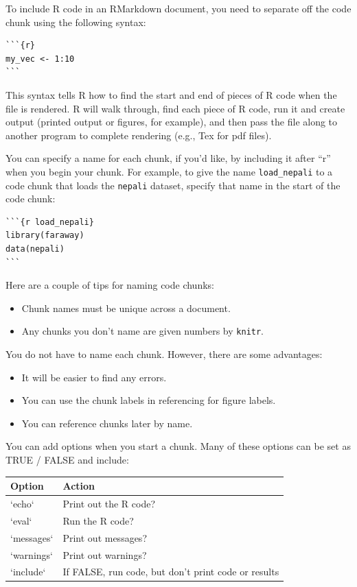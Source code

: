 \documentclass[]{book}
\providecommand{\tightlist}{%
  \setlength{\itemsep}{0pt}\setlength{\parskip}{0pt}}
\theoremstyle{definition}
\theoremstyle{definition}
\theoremstyle{definition}
\theoremstyle{remark}
\begin{document}
To include R code in an RMarkdown document, you need to separate off the
code chunk using the following syntax:

\begin{verbatim}
```{r}
my_vec <- 1:10
```
\end{verbatim}

This syntax tells R how to find the start and end of pieces of R code
when the file is rendered. R will walk through, find each piece of R
code, run it and create output (printed output or figures, for example),
and then pass the file along to another program to complete rendering
(e.g., Tex for pdf files).

You can specify a name for each chunk, if you'd like, by including it
after ``r'' when you begin your chunk. For example, to give the name
\texttt{load\_nepali} to a code chunk that loads the \texttt{nepali}
dataset, specify that name in the start of the code chunk: \bigskip

\begin{verbatim}
```{r load_nepali}
library(faraway)
data(nepali)
```
\end{verbatim}

Here are a couple of tips for naming code chunks:

\begin{itemize}
\tightlist
\item
  Chunk names must be unique across a document.
\item
  Any chunks you don't name are given numbers by \texttt{knitr}.
\end{itemize}

You do not have to name each chunk. However, there are some advantages:

\begin{itemize}
\tightlist
\item
  It will be easier to find any errors.\\
\item
  You can use the chunk labels in referencing for figure labels.
\item
  You can reference chunks later by name.
\end{itemize}

You can add options when you start a chunk. Many of these options can be
set as TRUE / FALSE and include:

\begin{tabular}{l|l}
\hline
Option & Action\\
\hline
`echo` & Print out the R code?\\
\hline
`eval` & Run the R code?\\
\hline
`messages` & Print out messages?\\
\hline
`warnings` & Print out warnings?\\
\hline
`include` & If FALSE, run code, but don't print code or results\\
\hline
\end{tabular}
\end{document}
